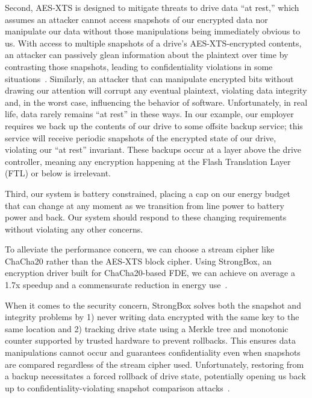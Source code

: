 Second, AES-XTS is designed to mitigate threats to drive data ``at rest,'' which
assumes an attacker cannot access snapshots of our encrypted data nor manipulate
our data without those manipulations being immediately obvious to us. With
access to multiple snapshots of a drive's AES-XTS-encrypted contents, an
attacker can passively glean information about the plaintext over time by
contrasting those snapshots, leading to confidentiality violations in some
situations~\cite{XEX, XTS}. Similarly, an attacker that can manipulate encrypted
bits without drawing our attention will corrupt any eventual plaintext,
violating data integrity and, in the worst case, influencing the behavior of
software. Unfortunately, in real life, data rarely remains ``at rest'' in these
ways. In our example, our employer requires we back up the contents of our drive
to some offsite backup service; this service will receive periodic snapshots of
the encrypted state of our drive, violating our ``at rest'' invariant. These
backups occur at a layer above the drive controller, meaning any encryption
happening at the Flash Translation Layer (FTL) or below is irrelevant.

Third, our system is battery constrained, placing a cap on our energy budget
that can change at any moment as we transition from line power to battery power
and back. Our system should respond to these changing requirements without
violating any other concerns.

To alleviate the performance concern, we can choose a stream cipher like
ChaCha20 rather than the AES-XTS block cipher. Using StrongBox, an encryption
driver built for ChaCha20-based FDE, we can achieve on average a 1.7x speedup
and a commensurate reduction in energy use~\cite{StrongBox}.

When it comes to the security concern, StrongBox solves both the snapshot and
integrity problems by 1) never writing data encrypted with the same key to the
same location and 2) tracking drive state using a Merkle tree and monotonic
counter supported by trusted hardware to prevent rollbacks. This ensures data
manipulations cannot occur and guarantees confidentiality even when snapshots
are compared regardless of the stream cipher used. Unfortunately, restoring from
a backup necessitates a forced rollback of drive state, potentially opening us
back up to confidentiality-violating snapshot comparison
attacks~\cite{StrongBox}.

